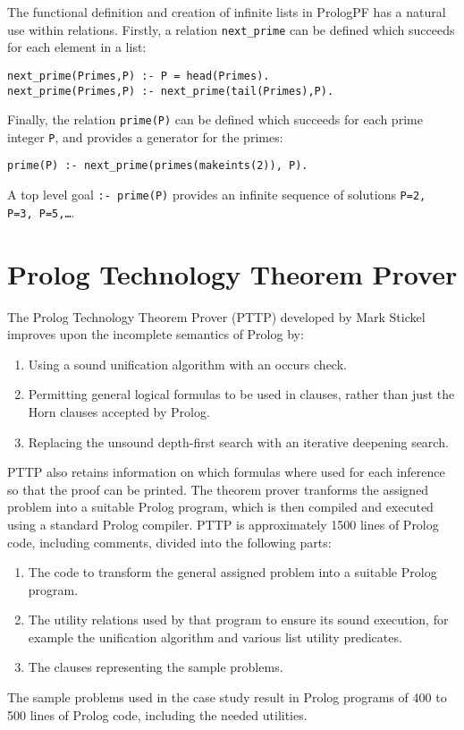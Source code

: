 The functional definition and creation of infinite lists in PrologPF has a natural 
use within relations.  Firstly, a relation \texttt{next\_{}prime} can be defined
which succeeds for each element in a list:
\begin{verbatim}
next_prime(Primes,P) :- P = head(Primes).
next_prime(Primes,P) :- next_prime(tail(Primes),P).
\end{verbatim}
Finally, the relation \texttt{prime(P)} can be defined which succeeds for each prime
integer \texttt{P}, and provides a generator for the primes:
\begin{verbatim}
prime(P) :- next_prime(primes(makeints(2)), P).
\end{verbatim}
A top level goal \texttt{:- prime(P)} provides an infinite sequence of solutions
\texttt{P=2, P=3, P=5,\ldots}.

\section{Prolog Technology Theorem Prover} %
\label{case_pttp}

The Prolog Technology Theorem Prover (PTTP) developed by Mark Stickel \cite{Sti88}
improves upon the incomplete semantics of Prolog by:
\begin{enumerate}
\item{Using a sound unification algorithm with an occurs check.}
\item{Permitting general logical formulas to be used in clauses, rather than just the
Horn clauses accepted by Prolog.}
\item{Replacing the unsound depth-first search with an iterative deepening search.}
\end{enumerate}
PTTP also retains information on which formulas where used for each inference so that
the proof can be printed.  The theorem prover tranforms the assigned problem into a
suitable Prolog program, which is then compiled and executed using a standard Prolog
compiler.  PTTP is approximately 1500 lines of Prolog code, including comments,
divided into the following parts:
\begin{enumerate}
\item{The code to transform the general assigned problem into a suitable Prolog
program.}
\item{The utility relations used by that program to ensure its sound execution, for
  example the unification algorithm and various list utility predicates.}
\item{The clauses representing the sample problems.}
\end{enumerate}
The sample problems used in the case study result in Prolog programs of 400 to 500
lines of Prolog code, including the needed utilities.

